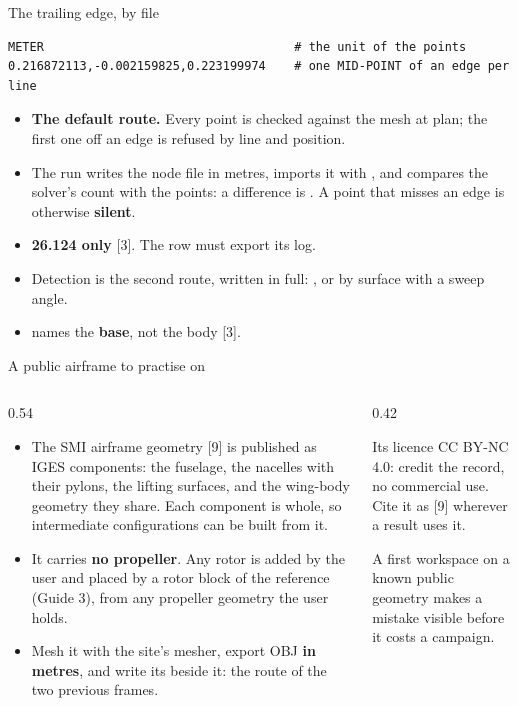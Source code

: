 \begin{frame}[fragile]{The trailing edge, by file}
\begin{lstlisting}[style=ftsbase]
METER                                   # the unit of the points
0.216872113,-0.002159825,0.223199974    # one MID-POINT of an edge per line
\end{lstlisting}
\begin{itemize}\small
  \item \textbf{The default route.} Every point is checked against the mesh at
        plan; the first one off an edge is refused by line and position.
  \item The run writes the node file in metres, imports it with
        , and compares the solver's count
        with the points: a difference is . A point that
        misses an edge is otherwise \textbf{silent}.
  \item \textbf{26.124 only} [3]. The row must export its log.
  \item Detection is the second route, written in full: ,
        or by surface with a sweep angle.
  \item {} names the \textbf{base}, not the body [3].
\end{itemize}
\end{frame}

\begin{frame}{A public airframe to practise on}
\begin{columns}[T]
\begin{column}{0.54\textwidth}
\begin{itemize}\small
  \item The SMI airframe geometry [9] is published as IGES components: the
        fuselage, the nacelles with their pylons, the lifting surfaces, and
        the wing-body geometry they share. Each component is whole, so
        intermediate configurations can be built from it.
  \item It carries \textbf{no propeller}. Any rotor is added by the user and
        placed by a rotor block of the reference (Guide 3), from any
        propeller geometry the user holds.
  \item Mesh it with the site's mesher, export OBJ \textbf{in metres}, and
        write its  beside it: the route of the
        two previous frames.
\end{itemize}
\end{column}
\begin{column}{0.42\textwidth}
\begin{block}{Its licence}
\small CC BY-NC 4.0: credit the record, no commercial use. Cite it as [9]
wherever a result uses it.
\end{block}
\begin{takeaway}A first workspace on a known public geometry makes a
mistake visible before it costs a campaign.\end{takeaway}
\end{column}
\end{columns}
\end{frame}


